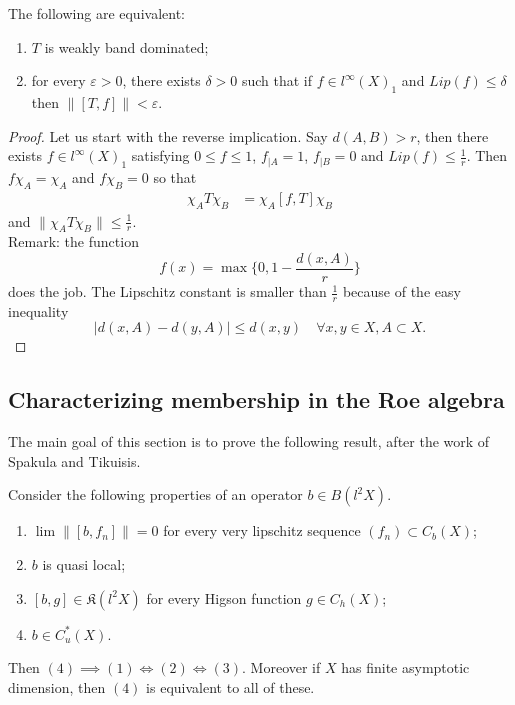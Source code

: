 \begin{thm}[Folklore]
The following are equivalent:
\begin{enumerate}
\item $T$ is weakly band dominated;
\item for every $\varepsilon>0$, there exists $\delta>0$ such that if $f\in l^\infty(X)_1$ and $Lip(f)\leq \delta$ then $\| [T,f] \| <\varepsilon$.
\end{enumerate}
\end{thm}

\begin{proof}
Let us start with the reverse implication. Say $d(A,B)> r$, then there exists $f\in l^\infty(X)_1$ satisfying $0\leq f \leq 1$, $f_{|A}=1$, $f_{|B}=0$ and $Lip(f)\leq \frac{1}{r}$. Then $f\chi_A = \chi_A$ and $f\chi_B = 0$ so that 
\[\begin{split}
\chi_A T \chi_B & = \chi_A [f,T]\chi_B
\end{split}\] 
and $\| \chi_A T\chi_B \| \leq \frac{1}{r}$.\\

Remark: the function
\[f(x)= \max \{0, 1-\frac{d(x,A)}{r}\}\]
does the job. The Lipschitz constant is smaller than $\frac{1}{r}$ because of the easy inequality
\[ | d(x,A) - d(y,A) | \leq d(x,y) \quad \forall x,y \in X ,A \subset X. \] 
\end{proof}

\subsection{Characterizing membership in the Roe algebra}

The main goal of this section is to prove the following result, after the work of Spakula and Tikuisis.

\begin{thm}
Consider the following properties of an operator $b\in B(l^2 X)$.
\begin{enumerate}
\item $\lim \| [b , f_n] \| =0  $ for every very lipschitz sequence $(f_n) \subset C_b(X)$;
\item $b$ is quasi local;
\item $[b , g ] \in \mathfrak K( l^2X)$ for every Higson function $g\in C_h(X)$;
\item $b \in C^*_u(X)$. 
\end{enumerate} 
Then $(4) \implies (1) \iff (2) \iff (3) $. Moreover if $X$ has finite asymptotic dimension, then $(4)$ is equivalent to all of these.
\end{thm}

